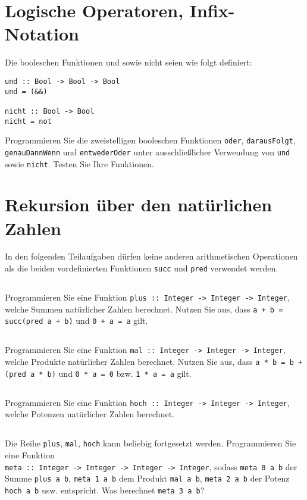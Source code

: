 \documentclass[
  10pt,                   %
  DIV12,
  german,                 %
  oneside,                %
  parskip=half,           %
  headings=normal,        %
  captions=tableheading,  %
]{scrartcl}
\begin{document}
\section{Logische Operatoren, Infix-Notation}
Die booleschen Funktionen und sowie nicht seien wie folgt definiert:

\begin{lstlisting}
und :: Bool -> Bool -> Bool
und = (&&)

nicht :: Bool -> Bool
nicht = not
\end{lstlisting}

Programmieren Sie die zweistelligen booleschen Funktionen \lstinline|oder|, \lstinline|darausFolgt|, \lstinline|genauDannWenn| und \lstinline|entwederOder| unter ausschließlicher Verwendung von \lstinline|und|
sowie \lstinline|nicht|. Testen Sie Ihre Funktionen.

\section{Rekursion über den natürlichen Zahlen}
In den folgenden Teilaufgaben dürfen keine anderen arithmetischen Operationen als die beiden vordefinierten Funktionen \lstinline|succ| und \lstinline|pred| verwendet werden.
\subsection{}
Programmieren Sie eine Funktion \lstinline|plus :: Integer -> Integer -> Integer|, welche Summen natürlicher Zahlen berechnet. Nutzen Sie aus, dass \lstinline|a + b = succ(pred a + b)| und \lstinline|0 + a = a| gilt.
\subsection{}
Programmieren Sie eine Funktion \lstinline|mal :: Integer -> Integer -> Integer|, welche Produkte natürlicher Zahlen berechnet. Nutzen Sie aus, dass \lstinline|a * b = b + (pred a * b)| und \lstinline|0 * a = 0| bzw. \lstinline|1 * a = a| gilt.
\subsection{}
Programmieren Sie eine Funktion \lstinline|hoch :: Integer -> Integer -> Integer|, welche Potenzen natürlicher Zahlen berechnet. 
\subsection{}
Die Reihe \lstinline|plus|, \lstinline|mal|, \lstinline|hoch| kann beliebig fortgesetzt werden. Programmieren Sie eine Funktion \\\lstinline|meta :: Integer -> Integer -> Integer -> Integer|, sodass \lstinline|meta 0 a b| der Summe \lstinline|plus a b|, \lstinline|meta 1 a b| dem Produkt \lstinline|mal a b|, \lstinline|meta 2 a b| der Potenz \lstinline|hoch a b| usw. entspricht. Was berechnet \lstinline|meta 3 a b|?
\end{document}
